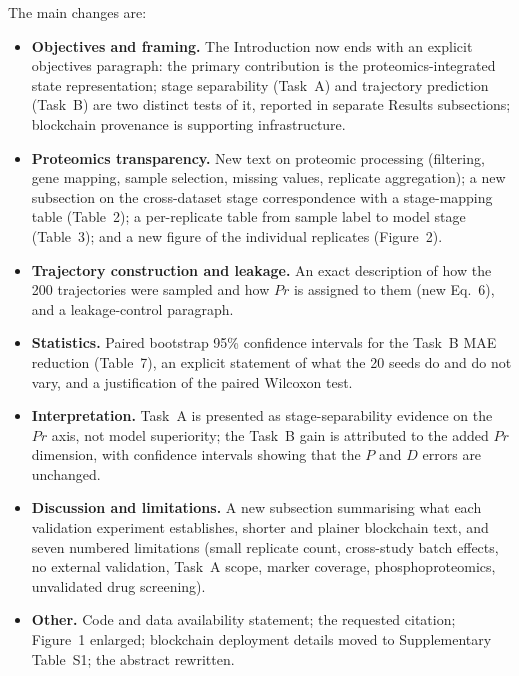 \documentclass[11pt]{article}
\begin{document}
\medskip
The main changes are:
\begin{itemize}
  \item \textbf{Objectives and framing.} The Introduction now ends with an explicit objectives paragraph: the primary contribution is the proteomics-integrated state representation; stage separability (Task~A) and trajectory prediction (Task~B) are two distinct tests of it, reported in separate Results subsections; blockchain provenance is supporting infrastructure.
  \item \textbf{Proteomics transparency.} New text on proteomic processing (filtering, gene mapping, sample selection, missing values, replicate aggregation); a new subsection on the cross-dataset stage correspondence with a stage-mapping table (Table~2); a per-replicate table from sample label to model stage (Table~3); and a new figure of the individual replicates (Figure~2).
  \item \textbf{Trajectory construction and leakage.} An exact description of how the 200 trajectories were sampled and how $Pr$ is assigned to them (new Eq.~6), and a leakage-control paragraph.
  \item \textbf{Statistics.} Paired bootstrap 95\% confidence intervals for the Task~B MAE reduction (Table~7), an explicit statement of what the 20 seeds do and do not vary, and a justification of the paired Wilcoxon test.
  \item \textbf{Interpretation.} Task~A is presented as stage-separability evidence on the $Pr$ axis, not model superiority; the Task~B gain is attributed to the added $Pr$ dimension, with confidence intervals showing that the $P$ and $D$ errors are unchanged.
  \item \textbf{Discussion and limitations.} A new subsection summarising what each validation experiment establishes, shorter and plainer blockchain text, and seven numbered limitations (small replicate count, cross-study batch effects, no external validation, Task~A scope, marker coverage, phosphoproteomics, unvalidated drug screening).
  \item \textbf{Other.} Code and data availability statement; the requested citation; Figure~1 enlarged; blockchain deployment details moved to Supplementary Table~S1; the abstract rewritten.
\end{itemize}
\end{document}
